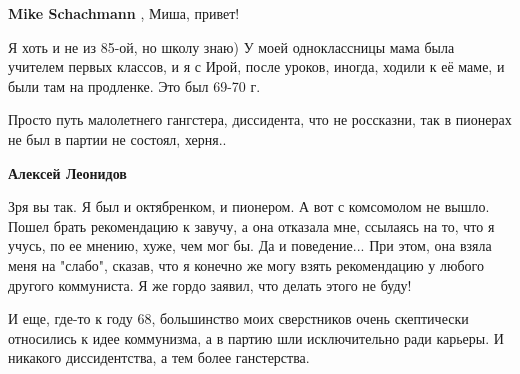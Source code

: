 \begin{itemize}
\begin{itemize}
\begin{itemize}
\textbf{Mike Schachmann} , Миша, привет!
\end{itemize}

 

Я хоть и не из 85-ой, но школу знаю) У моей одноклассницы мама была учителем
первых классов, и я с Ирой, после уроков, иногда, ходили к её маме, и были там
на продленке. Это был 69-70 г.

\end{itemize}

 
Просто путь малолетнего гангстера, диссидента, что не россказни, так в пионерах
не был в партии не состоял, херня..

\begin{itemize}
 

\textbf{Алексей Леонидов} 

Зря вы так. Я был и октябренком, и пионером. А вот с комсомолом не вышло. Пошел
брать рекомендацию к завучу, а она отказала мне, ссылаясь на то, что я учусь,
по ее мнению, хуже, чем мог бы. Да и поведение... При этом, она взяла меня на
"слабо", сказав, что я конечно же могу взять рекомендацию у любого другого
коммуниста. Я же гордо заявил, что делать этого не буду!



 

И еще, где-то к году 68, большинство моих сверстников очень скептически
относились к идее коммунизма, а в партию шли исключительно ради карьеры. И
никакого диссидентства, а тем более ганстерства.


\end{itemize}
\end{itemize}
